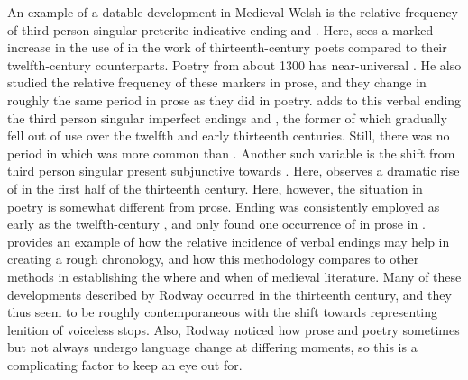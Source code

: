 An example of a datable development in Medieval Welsh is the relative frequency of third person singular preterite indicative ending  and . Here, \textcite{Rod_Datable98} sees a marked increase in the use of  in the work of thirteenth-century poets compared to their twelfth-century counterparts. Poetry from about 1300 has near-universal . He also studied the relative frequency of these markers in prose, and they change in roughly the same period in prose as they did in poetry. \Textcite[68--71]{Rod_Two03} adds to this verbal ending the third person singular imperfect endings  and \ei, the former of which gradually fell out of use over the twelfth and early thirteenth centuries. Still, there was no period in which  was more common than \ei. Another such variable is the shift from third person singular present subjunctive  towards . Here, \textcite[71--73]{Rod_Two03} observes a dramatic rise of  in the first half of the thirteenth century. Here, however, the situation in poetry is somewhat different from prose. Ending  was consistently employed as early as the twelfth-century , and \textcite[73]{Rod_Two03} only found one occurrence of  in prose in . \Textcite{Rod_Where07} provides an example of how the relative incidence of verbal endings may help in creating a rough chronology, and how this methodology compares to other methods in establishing the where and when of medieval literature.
Many of these developments described by Rodway occurred in the thirteenth century, and they thus seem to be roughly contemporaneous with the shift towards representing lenition of voiceless stops. Also, Rodway noticed how prose and poetry sometimes but not always undergo language change at differing moments, so this is a complicating factor to keep an eye out for.



